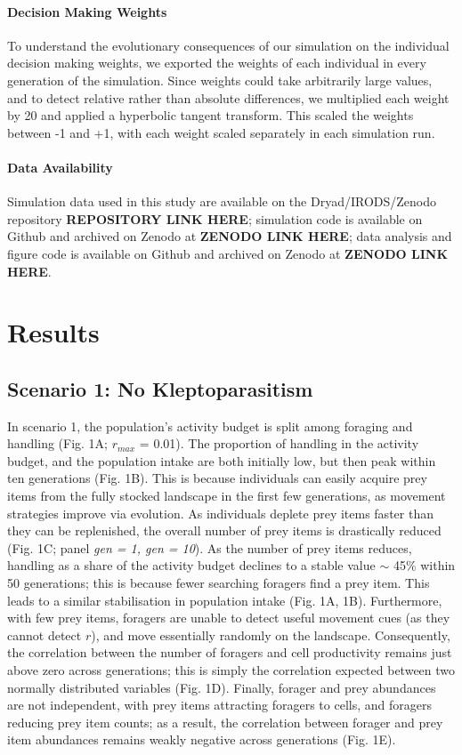 \documentclass[11pt]{article}
\begin{document}
\paragraph{Decision Making Weights}

To understand the evolutionary consequences of our simulation on the individual decision making weights, we exported the weights of each individual in every generation of the simulation.
Since weights could take arbitrarily large values, and to detect relative rather than absolute differences, we multiplied each weight by 20 and applied a hyperbolic tangent transform.
This scaled the weights between -1 and +1, with each weight scaled separately in each simulation run.

\paragraph*{Data Availability}

Simulation data used in this study are available on the Dryad/IRODS/Zenodo repository \textbf{REPOSITORY LINK HERE}; 
simulation code is available on Github and archived on Zenodo at \textbf{ZENODO LINK HERE}; 
data analysis and figure code is available on Github and archived on Zenodo at \textbf{ZENODO LINK HERE}.

\section{Results}

\subsection{Scenario 1: No Kleptoparasitism}

In scenario 1, the population's activity budget is split among foraging and handling (Fig. 1A; $r_{max}$ = 0.01).
The proportion of handling in the activity budget, and the population intake are both initially low, but then peak within ten generations (Fig. 1B).
This is because individuals can easily acquire prey items from the fully stocked landscape in the first few generations, as movement strategies improve via evolution.
As individuals deplete prey items faster than they can be replenished, the overall number of prey items is drastically reduced (Fig. 1C; panel \textit{gen = 1, gen = 10}).
As the number of prey items reduces, handling as a share of the activity budget declines to a stable value $\sim$ 45\% within 50 generations; this is because fewer searching foragers find a prey item.
This leads to a similar stabilisation in population intake (Fig. 1A, 1B).
Furthermore, with few prey items, foragers are unable to detect useful movement cues (as they cannot detect $r$), and move essentially randomly on the landscape.
Consequently, the correlation between the number of foragers and cell productivity remains just above zero across generations; this is simply the correlation expected between two normally distributed variables (Fig. 1D).
Finally, forager and prey abundances are not independent, with prey items attracting foragers to cells, and foragers reducing prey item counts; as a result, the correlation between forager and prey item abundances remains weakly negative across generations (Fig. 1E).
\end{document}

